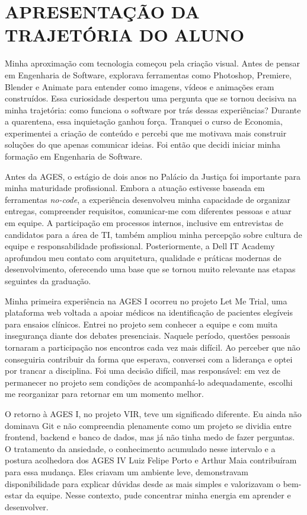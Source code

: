 \chapter[Apresentação da Trajetória do Aluno]{APRESENTAÇÃO DA TRAJETÓRIA DO ALUNO}

Minha aproximação com tecnologia começou pela criação visual. Antes de pensar
em Engenharia de Software, explorava ferramentas como Photoshop, Premiere,
Blender e Animate para entender como imagens, vídeos e animações eram
construídos. Essa curiosidade despertou uma pergunta que se tornou decisiva na
minha trajetória: como funciona o software por trás dessas experiências? Durante
a quarentena, essa inquietação ganhou força. Tranquei o curso de Economia,
experimentei a criação de conteúdo e percebi que me motivava mais construir
soluções do que apenas comunicar ideias. Foi então que decidi iniciar minha
formação em Engenharia de Software.

Antes da AGES, o estágio de dois anos no Palácio da Justiça foi importante para
minha maturidade profissional. Embora a atuação estivesse baseada em ferramentas
\textit{no-code}, a experiência desenvolveu minha capacidade de organizar
entregas, compreender requisitos, comunicar-me com diferentes pessoas e atuar
em equipe. A participação em processos internos, inclusive em entrevistas de
candidatos para a área de TI, também ampliou minha percepção sobre cultura de
equipe e responsabilidade profissional. Posteriormente, a Dell IT Academy
aprofundou meu contato com arquitetura, qualidade e práticas modernas de
desenvolvimento, oferecendo uma base que se tornou muito relevante nas etapas
seguintes da graduação.

Minha primeira experiência na AGES I ocorreu no projeto Let Me Trial, uma
plataforma web voltada a apoiar médicos na identificação de pacientes elegíveis
para ensaios clínicos. Entrei no projeto sem conhecer a equipe e com muita
insegurança diante dos debates presenciais. Naquele período, questões pessoais
tornaram a participação nos encontros cada vez mais difícil. Ao perceber que
não conseguiria contribuir da forma que esperava, conversei com a liderança e
optei por trancar a disciplina. Foi uma decisão difícil, mas responsável: em
vez de permanecer no projeto sem condições de acompanhá-lo adequadamente,
escolhi me reorganizar para retornar em um momento melhor.

O retorno à AGES I, no projeto VIR, teve um significado diferente. Eu ainda não
dominava Git e não compreendia plenamente como um projeto se dividia entre
frontend, backend e banco de dados, mas já não tinha medo de fazer perguntas.
O tratamento da ansiedade, o conhecimento acumulado nesse intervalo e a
postura acolhedora dos AGES IV Luiz Felipe Porto e Arthur Maia contribuíram para
essa mudança. Eles criavam um ambiente leve, demonstravam disponibilidade para
explicar dúvidas desde as mais simples e valorizavam o bem-estar da equipe.
Nesse contexto, pude concentrar minha energia em aprender e desenvolver.


